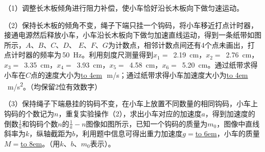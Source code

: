 （1）调整长木板倾角进行阻力补偿，使小车恰好沿长木板向下做匀速运动。

（2）保持长木板的倾角不变，绳子下端只挂一个钩码，将小车移近打点计时器，接通电源然后释放小车，小车沿长木板向下做匀加速直线运动，得到一条纸带如图所示，\(A\)、\(B\)、\(C\)、\(D\)、 \(E\)、\(F\)、\(G\)为计数点，相邻计数点间还有4个点未画出，打点计时器的频率为\,\qty{50}{Hz}。利用刻度尺测量得到\(x_1 =\) \,\qty{2.19}{cm}，\(x_2 =\) \,\qty{2.76}{cm}，\(x_3 =\) \,\qty{3.35}{cm}，\(x_4=\) \,\qty{3.93}{cm}，\(x_5 =\) \,\qty{4.58}{cm}，\(x_6 =\) \,\qty{5.20}{cm}。通过纸带求得小车在\(C\)点的速度大小为\underline{\hbox to 4em{}}\,\qty{}{m/s}；通过纸带求得小车加速度大小为\underline{\hbox to 4em{}}\,\qty{}{m/s^2}。（均保留2位有效数字）
  
（3）保持绳子下端悬挂的钩码不变，在小车上放置不同数量的相同钩码，小车上钩码的个数记为\(n\)，重复实验操作（2），求出小车对应的加速度\(a\)，得到加速度的倒数\(\frac{1}{a}\)和钩码个数\(n\)的\(\frac{1}{a} - n\)图像如图所示，已知一个钩码的质量为\(m_0\)，图像中直线斜率为\(k\)，纵轴截距为\(b\)，利用题中信息可得出重力加速度\(g =\)\underline{\hbox to 6em{}}，小车的质量\(M =\)\underline{\hbox to 8em{}}。（用\(k\)、\(b\)、\(m_0\)表示）。
